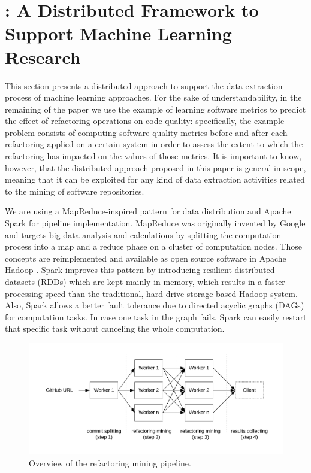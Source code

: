 
\section{\iris: A Distributed Framework to Support Machine Learning Research}
\label{sec:approach}

This section presents a distributed approach to support the data extraction process of machine learning approaches. For the sake of understandability, in the remaining of the paper we use the example of learning software metrics to predict the effect of refactoring operations on code quality: specifically, the example problem consists of computing software quality metrics before and after each refactoring applied on a certain system in order to assess the extent to which the refactoring has impacted on the values of those metrics. It is important to know, however, that the distributed approach proposed in this paper is general in scope, meaning that it can be exploited for any kind of data extraction activities related to the mining of software repositories. 

We are using a MapReduce-inspired pattern for data distribution and Apache Spark for pipeline implementation. MapReduce was originally invented by Google and targets big data analysis and calculations by splitting the computation process into a map and a reduce phase \cite{mapreduce2008} on a cluster of computation nodes. Those concepts are reimplemented and available as open source software in Apache Hadoop \cite{hadoop}. Spark improves this pattern by introducing resilient distributed datasets (RDDs) which are kept mainly in memory, which results in a faster processing speed than the traditional, hard-drive storage based Hadoop system. Also, Spark allows a better fault tolerance due to directed acyclic graphs (DAGs) for computation tasks. In case one task in the graph fails, Spark can easily restart that specific task without canceling the whole computation.

\begin{figure}
\caption{Overview of the refactoring mining pipeline.}
\centering
\includegraphics[scale=0.6]{pipeline}
\end{figure}

